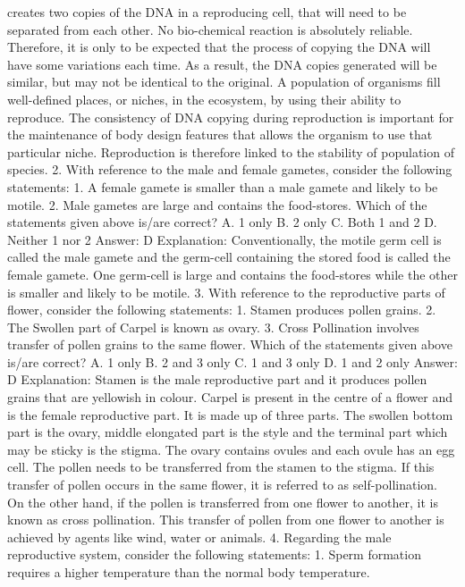 creates two copies of the DNA in a reproducing cell, that will need
to be separated from each other. No bio-chemical reaction is
absolutely reliable. Therefore, it is only to be expected that the
process of copying the DNA will have some variations each time. As a
result, the DNA copies generated will be similar, but may not be
identical to the original.
A population of organisms fill well-defined places, or niches, in the
ecosystem, by using their ability to reproduce. The consistency of
DNA copying during reproduction is important for the maintenance
of body design features that allows the organism to use that
particular niche. Reproduction is therefore linked to the stability of
population of species.
2. With reference to the male and female gametes, consider the
following statements:
1. A female gamete is smaller than a male gamete and likely to be
motile.
2. Male gametes are large and contains the food-stores.
Which of the statements given above is/are correct?
A. 1 only
B. 2 only
C. Both 1 and 2
D. Neither 1 nor 2
Answer: D
Explanation: Conventionally, the motile germ cell is called the male
gamete and the germ-cell containing the stored food is called the
female gamete. One germ-cell is large and contains the food-stores
while the other is smaller and likely to be motile.
3. With reference to the reproductive parts of flower, consider
the following statements:
1. Stamen produces pollen grains.
2. The Swollen part of Carpel is known as ovary.
3. Cross Pollination involves transfer of pollen grains to the same
flower.
Which of the statements given above is/are correct?
A. 1 only
B. 2 and 3 only
C. 1 and 3 only
D. 1 and 2 only
Answer: D
Explanation: Stamen is the male reproductive part and it produces
pollen grains that are yellowish in colour.
Carpel is present in the centre of a flower and is the female
reproductive part. It is made up of three parts. The swollen bottom
part is the ovary, middle elongated part is the style and the terminal
part which may be sticky is the stigma. The ovary contains ovules
and each ovule has an egg cell. The pollen needs to be transferred
from the stamen to the stigma.
If this transfer of pollen occurs in the same flower, it is referred
to as self-pollination. On the other hand, if the pollen is
transferred from one flower to another, it is known as cross
pollination. This transfer of pollen from one flower to another is
achieved by agents like wind, water or animals.
4. Regarding the male reproductive system, consider the
following statements:
1. Sperm formation requires a higher temperature than the normal
body temperature.
